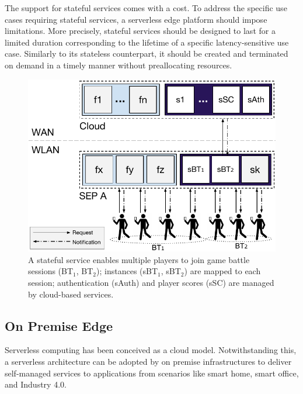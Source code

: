 The support for stateful services comes with a cost. To address the specific use cases requiring stateful services, a serverless edge platform should impose limitations. More precisely, stateful services should be designed to last for a limited duration corresponding to the lifetime of a specific latency-sensitive use case. Similarly to its stateless counterpart, it should be created and terminated on demand in a timely manner without preallocating resources.


\begin{figure}[tbp]
	\centering
	\includegraphics[width=\linewidth]{Figs/Stateful_Edge_Services.pdf}
	\caption{A stateful service enables multiple players to join game battle sessions (BT$_1$, BT$_2$); instances (sBT$_1$, sBT$_2$) are mapped to each session; authentication (sAuth) and player scores (sSC) are managed by cloud-based services.}
	\label{fig:Steteful_Edge_MMG}
\end{figure}


\subsection{On Premise Edge}

Serverless computing has been conceived as a cloud model. Notwithstanding this, a serverless architecture can be adopted by on premise infrastructures to deliver self-managed services to applications from scenarios like smart home, smart office, and Industry 4.0. 




